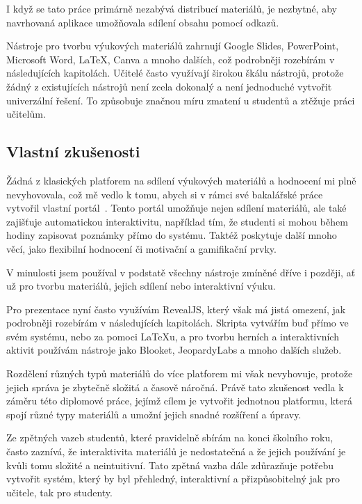 I když se tato práce primárně nezabývá distribucí materiálů, je nezbytné, aby navrhovaná aplikace umožňovala sdílení obsahu pomocí odkazů.

Nástroje pro tvorbu výukových materiálů zahrnují Google Slides, PowerPoint, Microsoft Word, \LaTeX, Canva a mnoho dalších, což podrobněji rozebírám v následujících kapitolách.
Učitelé často využívají širokou škálu nástrojů, protože žádný z existujících nástrojů není zcela dokonalý a není jednoduché vytvořit univerzální řešení.
To způsobuje značnou míru zmatení u studentů a ztěžuje práci učitelům.

\subsection{Vlastní zkušenosti}

Žádná z klasických platforem na sdílení výukových materiálů a hodnocení mi plně nevyhovovala, což mě vedlo k tomu, abych si v rámci své bakalářské práce vytvořil vlastní portál~\cite{cajthaml_bp}.
Tento portál umožňuje nejen sdílení materiálů, ale také zajišťuje automatickou interaktivitu, například tím, že studenti si mohou během hodiny zapisovat poznámky přímo do systému.
Taktéž poskytuje další mnoho věcí, jako flexibilní hodnocení či motivační a gamifikační prvky.

V minulosti jsem používal v podstatě všechny nástroje zmíněné dříve i později, ať už pro tvorbu materiálů, jejich sdílení nebo interaktivní výuku.

Pro prezentace nyní často využívám RevealJS, který však má jistá omezení, jak podrobněji rozebírám v následujících kapitolách.
Skripta vytvářím buď přímo ve svém systému, nebo za pomoci LaTeXu, a pro tvorbu herních a interaktivních aktivit používám nástroje jako Blooket, JeopardyLabs a mnoho dalších služeb.

Rozdělení různých typů materiálů do více platforem mi však nevyhovuje, protože jejich správa je zbytečně složitá a časově náročná.
Právě tato zkušenost vedla k záměru této diplomové práce, jejímž cílem je vytvořit jednotnou platformu, která spojí různé typy materiálů a umožní jejich snadné rozšíření a úpravy.

Ze zpětných vazeb studentů, které pravidelně sbírám na konci školního roku, často zaznívá, že interaktivita materiálů je nedostatečná a že jejich používání je kvůli tomu složité a neintuitivní.
Tato zpětná vazba dále zdůrazňuje potřebu vytvořit systém, který by byl přehledný, interaktivní a přizpůsobitelný jak pro učitele, tak pro studenty.

